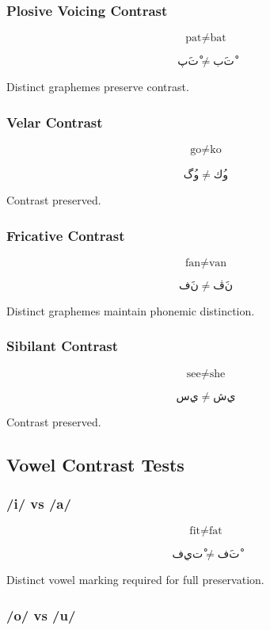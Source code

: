 \documentclass[12pt]{article}
\begin{document}
\subsubsection*{Plosive Voicing Contrast}

\[
\text{pat} \neq \text{bat}
\]

\[
پَتْ \neq بَتْ
\]

Distinct graphemes preserve contrast.

\subsubsection*{Velar Contrast}

\[
\text{go} \neq \text{ko}
\]

\[
گُو \neq كُو
\]

Contrast preserved.

\subsubsection*{Fricative Contrast}

\[
\text{fan} \neq \text{van}
\]

\[
فَن \neq ڤَن
\]

Distinct graphemes maintain phonemic distinction.

\subsubsection*{Sibilant Contrast}

\[
\text{see} \neq \text{she}
\]

\[
سِي \neq شِي
\]

Contrast preserved.

\subsection{Vowel Contrast Tests}

\subsubsection*{/i/ vs /a/}

\[
\text{fit} \neq \text{fat}
\]

\[
فِيتْ \neq فَتْ
\]

Distinct vowel marking required for full preservation.

\subsubsection*{/o/ vs /u/}
\end{document}
